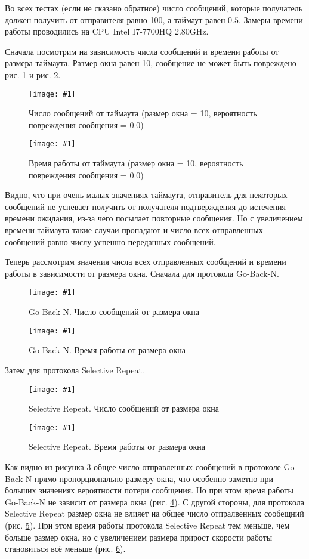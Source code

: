 \documentclass[a4paper,12pt]{article}
\newcommand{\plot}[3]{
    \begin{figure}[H]
        \begin{center}
            \texttt{[image: \#1]}
            \caption{#2}
            \label{#3}
        \end{center}
    \end{figure}
}
\begin{document}
    Во всех тестах (если не сказано обратное) число сообщений, которые получатель должен получить от отправителя равно 100,
    а таймаут равен $ 0.5 $. Замеры времени работы проводились на CPU Intel I7-7700HQ 2.80GHz.

    Сначала посмотрим на зависимость числа сообщений и времени работы от размера таймаута.
    Размер окна равен 10, сообщение не может быть повреждено рис. \ref{p:timeoutsMessageNum} и рис. \ref{p:timeoutsWorkingTime}.

    \plot{timeoutsMessageNum}{Число сообщений от таймаута (размер окна = 10, вероятность повреждения сообщения = 0.0)}{p:timeoutsMessageNum}
    \plot{timeoutsWorkingTime}{Время работы от таймаута (размер окна = 10, вероятность повреждения сообщения = 0.0)}{p:timeoutsWorkingTime}

    Видно, что при очень малых значениях таймаута, отправитель для некоторых сообщений не успевает получить от получателя
    подтверждения до истечения времени ожидания, из-за чего посылает повторные сообщения.
    Но с увеличением времени таймаута такие случаи пропадают и число всех отправленных сообщений равно числу успешно переданных сообщений.

    Теперь рассмотрим значения числа всех отправленных сообщений и времени работы в зависимости от размера окна.
    Сначала для протокола Go-Back-N.

    \plot{rateSizeGBNMessageNum}{Go-Back-N. Число сообщений от размера окна}{p:rateSizeGBNMessageNum}
    \plot{rateSizeGBNWorkingTime}{Go-Back-N. Время работы от размера окна}{p:rateSizeGBNWorkingTime}

    Затем для протокола Selective Repeat.

    \plot{rateSizeSRPMessageNum}{Selective Repeat. Число сообщений от размера окна}{p:rateSizeSRPMessageNum}
    \plot{rateSizeSRPWorkingTime}{Selective Repeat. Время работы от размера окна}{p:rateSizeSRPWorkingTime}

    Как видно из рисунка \ref{p:rateSizeGBNMessageNum} общее число отправленных сообщений в протоколе Go-Back-N
    прямо пропорционально размеру окна, что особенно заметно при больших значениях вероятности потери сообщения.
    Но при этом время работы Go-Back-N не зависит от размера окна (рис. \ref{p:rateSizeGBNWorkingTime}).
    С другой стороны, для протокола Selective Repeat размер окна не влияет на общее число отпралвенных сообещний (рис. \ref{p:rateSizeSRPMessageNum}).
    При этом время работы протокола Selective Repeat тем меньше, чем больше размер окна,
    но с увеличением размера прирост скорости работы становиться всё меньше (рис. \ref{p:rateSizeSRPWorkingTime}). 
\end{document}
